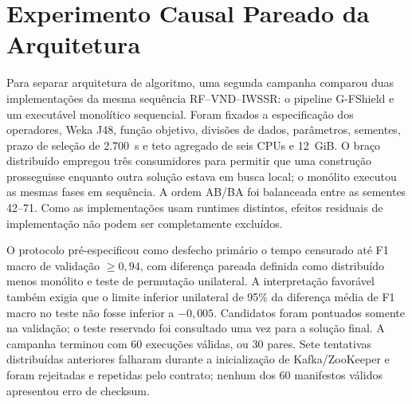 \section{Experimento Causal Pareado da Arquitetura}
\label{sec:architecture-causal}

Para separar arquitetura de algoritmo, uma segunda campanha comparou duas implementações da mesma sequência RF--VND--IWSSR: o pipeline G-FShield e um executável monolítico sequencial. Foram fixados a especificação dos operadores, Weka J48, função objetivo, divisões de dados, parâmetros, sementes, prazo de seleção de 2.700~s e teto agregado de seis CPUs e 12~GiB. O braço distribuído empregou três consumidores para permitir que uma construção prosseguisse enquanto outra solução estava em busca local; o monólito executou as mesmas fases em sequência. A ordem AB/BA foi balanceada entre as sementes 42--71. Como as implementações usam runtimes distintos, efeitos residuais de implementação não podem ser completamente excluídos.

O protocolo pré-especificou como desfecho primário o tempo censurado até F1 macro de validação $\geq 0{,}94$, com diferença pareada definida como distribuído menos monólito e teste de permutação unilateral. A interpretação favorável também exigia que o limite inferior unilateral de 95\% da diferença média de F1 macro no teste não fosse inferior a $-0{,}005$. Candidatos foram pontuados somente na validação; o teste reservado foi consultado uma vez para a solução final. A campanha terminou com 60 execuções válidas, ou 30 pares. Sete tentativas distribuídas anteriores falharam durante a inicialização de Kafka/ZooKeeper e foram rejeitadas e repetidas pelo contrato; nenhum dos 60 manifestos válidos apresentou erro de checksum.

